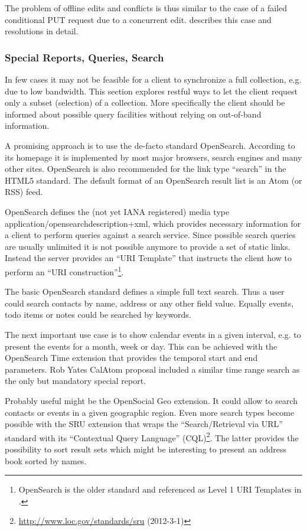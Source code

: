 \documentclass[12pt,a4paper]{scrartcl}		%
\newcommand{\citeurl}[2]{\url{#1} (#2)}
\begin{document}
The problem of offline edits and conflicts is thus similar to the case of a
failed conditional PUT request due to a concurrent edit. \cite{Nielsen1999}
describes this case and resolutions in detail.

\subsubsection{Special Reports, Queries, Search}
\label{sec:spec-reports-search}

In few cases it may not be feasible for a client to synchronize a full
collection, e.g. due to low bandwidth. This section explores restful ways to let
the client request only a subset (selection) of a collection. More specifically
the client should be informed about possible query facilities without relying on
out-of-band information.

A promising approach is to use the de-facto standard
OpenSearch\cite{Clinton}. According to its homepage it is implemented by most
major browsers, search engines and many other sites. OpenSearch is also
recommended for the link type ``search'' in the HTML5
standard\cite[sec. 4.12.4.12]{Hickson2011a}. The default format of an OpenSearch
result list is an Atom (or RSS) feed.

OpenSearch defines the (not yet IANA registered) media type
application/opensearchdescription+xml, which provides necessary information for
a client to perform queries against a search service. Since possible search
queries are usually unlimited it is not possible anymore to provide a set of
static links. Instead the server provides an ``URI Template''\cite{Gregorio2012}
that instructs the client how to perform an ``URI
construction''\footnote{OpenSearch is the older standard and referenced as Level
  1 URI Templates in \cite{Gregorio2012}.}.

The basic OpenSearch standard defines a simple full text search. Thus a user
could search contacts by name, address or any other field value. Equally events,
todo items or notes could be searched by keywords.

The next important use case is to show calendar events in a given interval,
e.g. to present the events for a month, week or day. This can be achieved with
the OpenSearch Time extension that provides the temporal start and end
parameters. Rob Yates CalAtom\cite{draft-yates-atompub-calatom-00.txt} proposal
included a similar time range search as the only but mandatory special report.

Probably useful might be the OpenSocial Geo extension. It could allow to search
contacts or events in a given geographic region. Even more search types become
possible with the SRU extension that wraps the ``Search/Retrieval via URL''
standard with its ``Contextual Query Language''
(CQL)\footnote{\citeurl{http://www.loc.gov/standards/sru}{2012-3-1}}. The latter
provides the possibility to sort result sets which might be interesting to
present an address book sorted by names.
\end{document}
